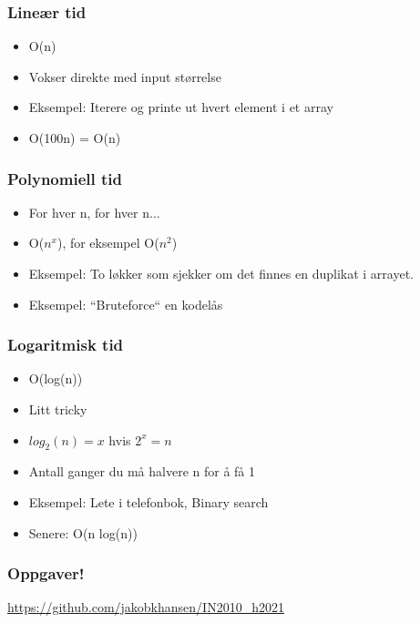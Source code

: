 \documentclass[norsk]{beamer}
\begin{document}
    \begin{frame}
        \frametitle{Lineær tid}

        \begin{itemize}
            \item O(n)
            \item Vokser direkte med input størrelse
            \item Eksempel: Iterere og printe ut hvert element i et array
            \item O(100n) = O(n)
        \end{itemize}

    \end{frame}

    \begin{frame}
        \frametitle{Polynomiell tid}

        \begin{itemize}
            \item For hver n, for hver n...
            \item O($n^x$), for eksempel O($n^2$)
            \item Eksempel: To løkker som sjekker om det finnes en duplikat i arrayet.
            \item Eksempel: ``Bruteforce`` en kodelås
        \end{itemize}
    \end{frame}

    \begin{frame}
        \frametitle{Logaritmisk tid}

        \begin{itemize}
            \item O(log(n))
            \item Litt tricky
            \item $log_2(n) = x$ hvis $2^x = n$
            \item Antall ganger du må halvere n for å få 1
            \item Eksempel: Lete i telefonbok, Binary search
            \item Senere: O(n log(n))
        \end{itemize}
    \end{frame}

    \begin{frame}
        \frametitle{Oppgaver!}

        \begin{center}
            \url{https://github.com/jakobkhansen/IN2010_h2021}
        \end{center}
    \end{frame}
\end{document}

